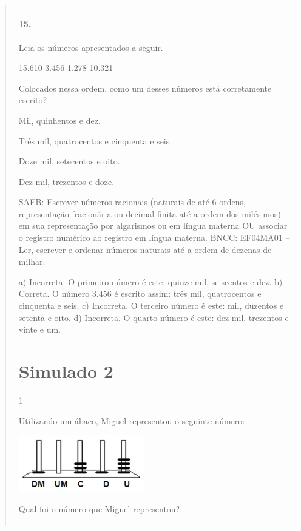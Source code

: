\begin{mdframed}[linewidth=2pt,linecolor=salmao,roundcorner=2pt]
\begin{itemize}
{\begin{itemize}
\begin{escolha}
{\begin{quote}
{\begin{escolha}
{{{{{\begin{longtable}[]{@{}l@{}}
\begin{itemize}
{\subsubsection{15.}

Leia os números apresentados a seguir.

15.610
3.456
1.278
10.321

Colocados nessa ordem, como um desses números está corretamente escrito?

\begin{escolha}
\item Mil, quinhentos e dez.
\item Três mil, quatrocentos e cinquenta e seis.
\item Doze mil, setecentos e oito.
\item Dez mil, trezentos e doze.
\end{escolha}

SAEB: Escrever números racionais (naturais de até 6 ordens, representação
fracionária ou decimal finita até a ordem dos milésimos) em sua
representação por algarismos ou em língua materna OU associar o registro
numérico ao registro em língua materna.
BNCC: EF04MA01 -- Ler, escrever e ordenar números naturais até a ordem de dezenas de milhar.

a) Incorreta. O primeiro número é este: quinze mil, seiscentos e dez.
b) Correta. O número 3.456 é escrito assim: três mil, quatrocentos e cinquenta e seis.
c) Incorreta. O terceiro número é este: mil, duzentos e setenta e oito.
d) Incorreta. O quarto número é este: dez mil, trezentos e vinte e um.

\chapter{Simulado 2}
\markboth{Simulado 2}{}

\num{1}

Utilizando um ábaco, Miguel representou o seguinte número:

\includegraphics[width=2.14744in,height=0.97003in]{media/image152.png}


Qual foi o número que Miguel representou?

}
\end{itemize}
\end{longtable}}}}}}
\end{escolha}}
\end{quote}}
\end{escolha}
\end{itemize}}
\end{itemize}
\end{mdframed}
